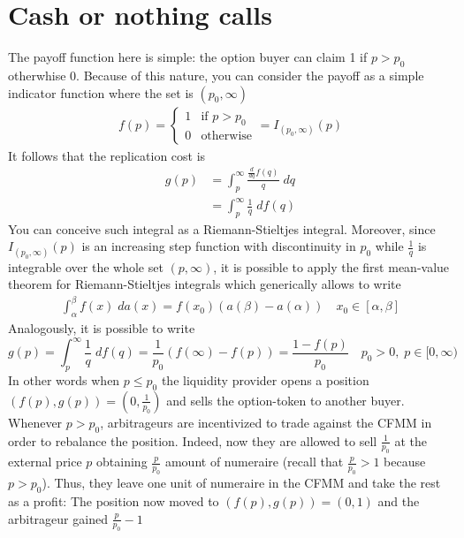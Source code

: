 \documentclass[12pt]{article}
\begin{document}
\section{Cash or nothing calls}
The payoff function here is simple: the option buyer can claim 1 if $p> p_0$ otherwhise 0. Because of this nature, you can consider the payoff as a simple indicator function where the set is $(p_0,\infty)$
\begin{align*}
    f(p) = \begin{cases}
               1 & \text{if } p>p_0 \\
               0 & \text{otherwise}
           \end{cases} = I_{(p_0,\infty)}(p)
\end{align*}
It follows that the replication cost is
\begin{align*}
    g(p) & =\int_{p}^{\infty}\frac{\frac{d}{dq}f(q)}{q}  \; dq \\
         & =\int_{p}^{\infty}\frac{1}{q}  \; df(q)
\end{align*}
You can conceive such integral as a Riemann-Stieltjes integral. Moreover, since $I_{(p_0,\infty)}(p)$ is an increasing step function with discontinuity in $p_0$ while $\frac{1}{q}$ is integrable over the whole set $(p,\infty)$, it is possible to apply the first mean-value theorem for Riemann-Stieltjes integrals which generically allows to write
\begin{align*}
    \int_\alpha^\beta f(x) \; da(x) = f(x_0) (a(\beta)-a(\alpha))\quad x_0\in[\alpha,\beta]
\end{align*}
Analogously, it is possible to write
\begin{equation}
    g(p)=\int_{p}^{\infty}\frac{1}{q}  \; df(q)=\frac{1}{p_0}(f(\infty)-f(p))=\frac{1-f(p)}{p_0} \quad p_0>0, \; p\in[0,\infty) \label{eq:12}
\end{equation}
In other words when $p\leq p_0$ the liquidity provider opens a position $(f(p),g(p))=\left(0,\frac{1}{p_0}\right)$ and sells the option-token to another buyer.
Whenever $p>p_0$, arbitrageurs are incentivized to trade against the CFMM in order to rebalance the position. Indeed, now they are allowed to sell $\frac{1}{p_0}$ at the external price $p$ obtaining $\frac{p}{p_0}$ amount of numeraire (recall that $\frac{p}{p_0}>1 $ because $ p>p_0$). Thus, they leave one unit of numeraire in the CFMM and take the rest as a profit: The position now moved to $(f(p),g(p))=(0,1)$ and the arbitrageur gained $\frac{p}{p_0}-1$
\newline\newline
\end{document}
